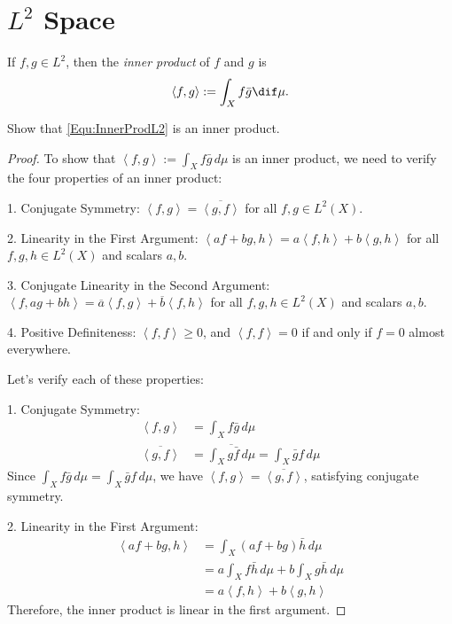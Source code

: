 \section{$L^{2}$ Space}
\begin{defn}
    \label{Defn:InnerProdOnL2}
    If $f,g\in L^{2}$, then the \textit{inner product} of $f$ and $g$ 
    is 
    \begin{equation}
        \label{Equ:InnerProdL2}
        \left<f,g\right>:=\int_{X}f\bar{g}\dif\mu.
    \end{equation}
\end{defn}
\begin{exc}
    Show that \eqref{Equ:InnerProdL2} is an inner product.
\end{exc}
\begin{proof}
    To show that $\left<f,g\right>:=\int_{X}f\bar{g}\,d\mu$ 
    is an inner product, we need to verify the four 
    properties of an inner product:

1. Conjugate Symmetry: $\left<f,g\right> = 
\overline{\left<g,f\right>}$ for all $f,g \in L^2(X)$.

2. Linearity in the First Argument: $\left<af + bg, 
h\right> = a\left<f,h\right> + b\left<g,h\right>$ for all 
$f,g,h \in L^2(X)$ and scalars $a,b$.

3. Conjugate Linearity in the Second Argument: 
$\left<f, ag + bh\right> = \overline{a}\left<f,g\right> + 
\overline{b}\left<f,h\right>$ for all $f,g,h \in L^2(X)$ 
and scalars $a,b$.

4. Positive Definiteness: $\left<f,f\right> \geq 0$, 
and $\left<f,f\right> = 0$ if and only if $f = 0$ almost 
everywhere.

Let's verify each of these properties:

1. Conjugate Symmetry:
   \begin{align*}
   \left<f,g\right> &= \int_{X}f\bar{g}\,d\mu \\
   \overline{\left<g,f\right>} &= 
   \overline{\int_{X}g\bar{f}\,d\mu} = 
   \int_{X}\bar{g}f\,d\mu
   \end{align*}
   Since $\int_{X}f\bar{g}\,d\mu = \int_{X}\bar{g}f\,d\mu$, 
   we have $\left<f,g\right> = \overline{\left<g,f\right>}$, 
   satisfying conjugate symmetry.

2. Linearity in the First Argument:
   \begin{align*}
   \left<af + bg, h\right> &= \int_{X}(af + bg)\bar{h}\,
   d\mu \\
   &= a\int_{X}f\bar{h}\,d\mu + b\int_{X}g\bar{h}\,d\mu \\
   &= a\left<f,h\right> + b\left<g,h\right>
   \end{align*}
   Therefore, the inner product is linear in the first 
   argument.


\end{proof}
